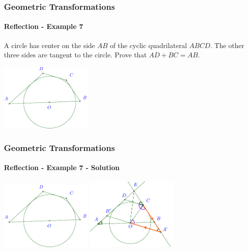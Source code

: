 \documentclass[8pt,xcolor=table,dvipsnames]{beamer}
\begin{document}
\begin{frame}[t]
    \frametitle{Geometric Transformations}
    \framesubtitle{Reflection - Example 7}
    \begin{example}
        A circle has center on the side $AB$ of the cyclic quadrilateral $ABCD$.
        The other three sides are tangent to the circle. Prove that $AD + BC = AB$.    
    \end{example}

    \bigbreak
    \begin{center}
        \includegraphics[width=4.5cm]{./svg/pdf/imo-1985-1-1.pdf}
    \end{center}
\end{frame}

\begin{frame}[t]
    \frametitle{Geometric Transformations}
    \framesubtitle{Reflection - Example 7 - Solution}
    \begin{center}
        \begin{overprint}
            \centering\includegraphics[width=4.5cm]{./svg/pdf/imo-1985-1-1.pdf}
            \centering\includegraphics[width=4.5cm]{./svg/pdf/imo-1985-1-4.pdf}
        \end{overprint}        
    \end{center}

\end{frame}
\end{document}
